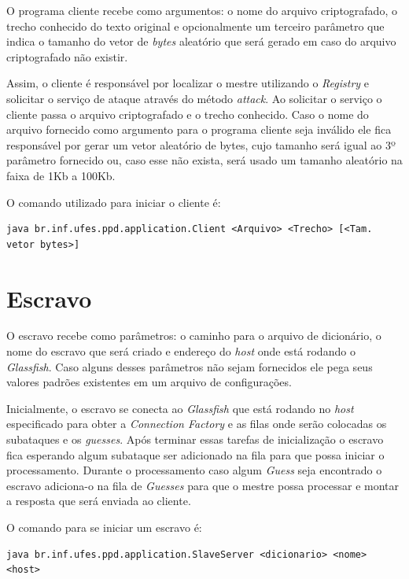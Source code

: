 \documentclass[
	12pt,				%
    oneside,			%
	a4paper,			%
	english,			%
	brazil,				%
	]{abntex2}
\begin{document}
O programa cliente recebe como argumentos: o nome do arquivo criptografado, o trecho conhecido do texto original e opcionalmente um terceiro parâmetro que indica o tamanho do vetor de \textit{bytes} aleatório que será gerado em caso do arquivo criptografado não existir.

Assim, o cliente é responsável por localizar o mestre utilizando o \textit{Registry} e solicitar o serviço de ataque através do método \textit{attack}. Ao solicitar o serviço o cliente passa o arquivo criptografado e o trecho conhecido. Caso o nome do arquivo fornecido como argumento para o programa cliente seja inválido ele fica responsável por gerar um vetor aleatório de bytes, cujo tamanho será igual ao 3º parâmetro fornecido ou, caso esse não exista, será usado um tamanho aleatório na faixa de 1Kb a 100Kb.

O comando utilizado para iniciar o cliente é:

\begin{lstlisting}
java br.inf.ufes.ppd.application.Client <Arquivo> <Trecho> [<Tam. vetor bytes>]\end{lstlisting}


\section{Escravo}
O escravo recebe como parâmetros: o caminho para o arquivo de dicionário, o nome do escravo que será criado e endereço do \textit{host} onde está rodando o \textit{Glassfish}. Caso alguns desses parâmetros não sejam fornecidos ele pega seus valores padrões existentes em um arquivo de configurações.

Inicialmente, o escravo se conecta ao \textit{Glassfish} que está rodando no \textit{host} especificado para obter a \textit{Connection Factory} e as filas onde serão colocadas os subataques e os \textit{guesses}. Após terminar essas tarefas de inicialização o escravo fica esperando algum subataque ser adicionado na fila para que possa iniciar o processamento. Durante o processamento caso algum \textit{Guess} seja encontrado o escravo adiciona-o na fila de \textit{Guesses} para que o mestre possa processar e montar a resposta que será enviada ao cliente.

O comando para se iniciar um escravo é:

\begin{lstlisting}
java br.inf.ufes.ppd.application.SlaveServer <dicionario> <nome> <host>\end{lstlisting}
\end{document}
